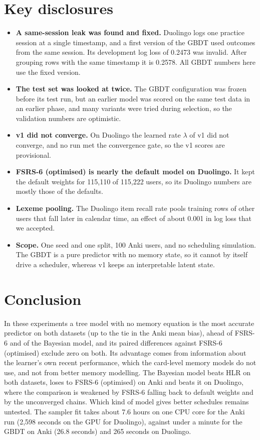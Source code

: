 \documentclass[11pt,a4paper]{article}
\begin{document}
\section{Key disclosures}
\begin{itemize}
  \item \textbf{A same-session leak was found and fixed.} Duolingo logs one practice session at a single timestamp, and a first version of the GBDT used outcomes from the same session. Its development log loss of 0.2473 was invalid. After grouping rows with the same timestamp it is 0.2578. All GBDT numbers here use the fixed version.
  \item \textbf{The test set was looked at twice.} The GBDT configuration was frozen before its test run, but an earlier model was scored on the same test data in an earlier phase, and many variants were tried during selection, so the validation numbers are optimistic.
  \item \textbf{v1 did not converge.} On Duolingo the learned rate $\lambda$ of v1 did not converge, and no run met the convergence gate, so the v1 scores are provisional.
  \item \textbf{FSRS-6 (optimised) is nearly the default model on Duolingo.} It kept the default weights for 115,110 of 115,222 users, so its Duolingo numbers are mostly those of the defaults.
  \item \textbf{Lexeme pooling.} The Duolingo item recall rate pools training rows of other users that fall later in calendar time, an effect of about 0.001 in log loss that we accepted.
  \item \textbf{Scope.} One seed and one split, 100 Anki users, and no scheduling simulation. The GBDT is a pure predictor with no memory state, so it cannot by itself drive a scheduler, whereas v1 keeps an interpretable latent state.
\end{itemize}

\section{Conclusion}
In these experiments a tree model with no memory equation is the most accurate predictor on both datasets (up to the tie in the Anki mean bias), ahead of FSRS-6 and of the Bayesian model, and its paired differences against FSRS-6 (optimised) exclude zero on both. Its advantage comes from information about the
learner's own recent performance, which the card-level memory models do not use, and not from better memory modelling. The Bayesian model beats HLR on both datasets, loses to FSRS-6 (optimised) on Anki and beats it on Duolingo, where the comparison is weakened by
FSRS-6 falling back to default weights and by the unconverged chains. Which kind of model gives better schedules remains untested. The sampler fit takes about 7.6 hours on one CPU core for the Anki run (2,598 seconds on the GPU for Duolingo), against under a minute for the GBDT on Anki (26.8 seconds) and 265 seconds on Duolingo.
\end{document}
